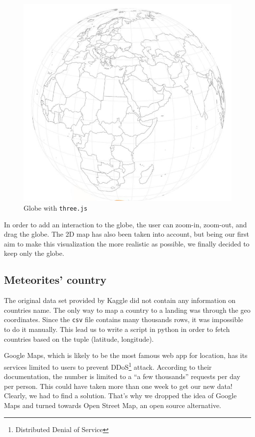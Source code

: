 \documentclass[10pt,conference,compsocconf]{IEEEtran}
\begin{document}
\begin{figure}[H]
  \centering
  \includegraphics[width=\columnwidth]{images/globe.jpg}
  \vspace{-3mm}
  \caption{Globe with \texttt{three.js}}
  \label{fig:globe}
\end{figure}

In order to add an interaction to the globe, the user can zoom-in, zoom-out, and drag the globe. 
The 2D map has also been taken into account, but being our first aim to make this visualization the more realistic as possible, we finally decided to keep only the globe.

\subsection{Meteorites' country}

The original data set provided by Kaggle did not contain any information on countries name. The only way to map a country to a landing was through the geo coordinates. Since the \texttt{csv} file contains many thousands rows, it was impossible to do it manually. This lead us to write a script in python in order to fetch countries based on the tuple (latitude, longitude).

Google Maps, which is likely to be the most famous web app for location, has its services limited to users to prevent DDoS\footnote{Distributed Denial of Service} attack. According to their documentation, the number is limited to a ``a few thousands'' requests per day per person. This could have taken more than one week to get our new data! Clearly, we had to find a solution. That's why we dropped the idea of Google Maps and turned towards Open Street Map, an open source alternative.
\end{document}
